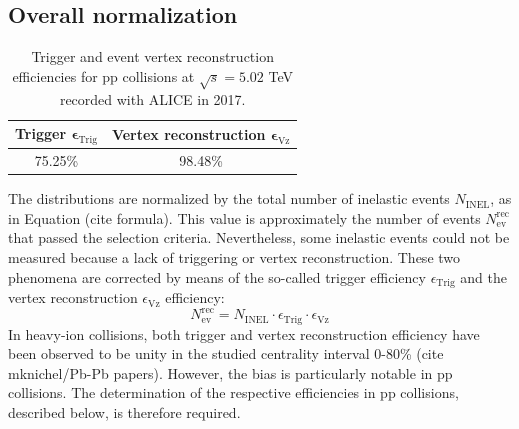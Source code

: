 \documentclass[12pt,a4paper]{report}
\begin{document}
\subsection{Overall normalization}
\label{Norm}
\begin{table}[H]
\centering
\renewcommand{\arraystretch}{1.5}
\begin{tabular}{|c|c|}
\toprule
\rowcolor{headerBlue}  \textbf{Trigger} $\boldsymbol \epsilon_\text{Trig}$ &  \textbf{Vertex reconstruction} $\boldsymbol \epsilon_\text{Vz}$\\
\hline
75.25\%	&	98.48\%		 \\
\bottomrule
\end{tabular}
\caption{Trigger and event vertex reconstruction efficiencies for pp collisions at $\sqrt{s} = 5.02$ TeV recorded with ALICE in 2017.}
\label{tab:effs}
\end{table} 
The \pt distributions are normalized by the total number of inelastic events $N_\text{INEL}$, as in Equation (cite formula). This value is approximately the number of events $N_\text{ev}^\text{rec}$ that passed the selection criteria. Nevertheless, some inelastic events could not be measured because a lack of triggering or vertex reconstruction. These two phenomena are corrected by means of the so-called trigger efficiency $\epsilon_\text{Trig}$ and the vertex reconstruction $\epsilon_\text{Vz}$ efficiency:
\begin{equation}
N_\text{ev}^\text{rec} = N_\text{INEL}\cdot \epsilon_\text{Trig} \cdot \epsilon_\text{Vz}
\end{equation}
In heavy-ion collisions, both trigger and vertex reconstruction efficiency have been observed to be unity in the studied centrality interval 0-80\% (cite mknichel/Pb-Pb papers). However, the bias is particularly notable in pp collisions. The determination of the respective efficiencies in pp collisions, described below, is therefore required.
\end{document}
